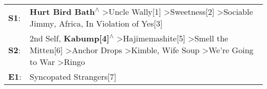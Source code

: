 \begin{supertabular}{p{0.03\textwidth}p{0.92\textwidth}}
 \textbf{S1}:  &                                                                                                                                                 \textbf{Hurt Bird Bath\textsuperscript{$\wedge$}} \textgreater \enspace Uncle Wally[1]\textsuperscript{} \textgreater \enspace Sweetness[2]\textsuperscript{} \textgreater \enspace Sociable Jimmy\textsuperscript{}, \enspace Africa\textsuperscript{}, \enspace In Violation of Yes[3]\textsuperscript{}  \enspace  \\
 \textbf{S2}:  &  2nd Self\textsuperscript{}, \enspace \textbf{Kabump[4]\textsuperscript{$\wedge$}} \textgreater \enspace Hajimemashite[5]\textsuperscript{} \textgreater \enspace Smell the Mitten[6]\textsuperscript{} \textgreater \enspace Anchor Drops\textsuperscript{} \textgreater \enspace Kimble\textsuperscript{}, \enspace Wife Soup\textsuperscript{} \textgreater \enspace We're Going to War\textsuperscript{} \textgreater \enspace Ringo\textsuperscript{}  \enspace  \\
 \textbf{E1}:  &                                                                                                                                                                                                                                                                                                                                                                                                                  Syncopated Strangers[7]\textsuperscript{}  \enspace  \\
\end{supertabular}
